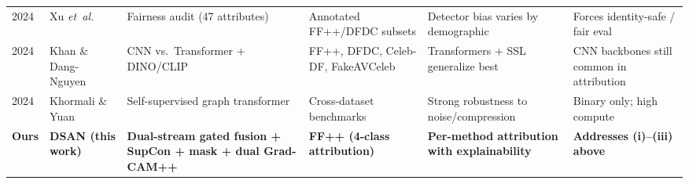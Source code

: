\begin{table}[!t]
\begin{tabular}{@{}p{0.6cm} p{2.6cm} p{3.7cm} p{2.6cm} p{2.9cm} p{3.4cm}@{}}
2024 & Xu \textit{et~al.}~\cite{xu2024fairness} & Fairness audit (47 attributes) & Annotated FF++/DFDC subsets & Detector bias varies by demographic & Forces identity-safe / fair eval \\
2024 & Khan \& Dang-Nguyen~\cite{khan2024generalization} & CNN vs.\ Transformer + DINO/CLIP & FF++, DFDC, Celeb-DF, FakeAVCeleb & Transformers + SSL generalize best & CNN backbones still common in attribution \\
2024 & Khormali \& Yuan~\cite{khormali2024selfsupgraph} & Self-supervised graph transformer & Cross-dataset benchmarks & Strong robustness to noise/compression & Binary only; high compute \\
\midrule
\textbf{Ours} & \textbf{DSAN (this work)} & \textbf{Dual-stream gated fusion + SupCon + mask + dual Grad-CAM++} & \textbf{FF++ (4-class attribution)} & \textbf{Per-method attribution with explainability} & \textbf{Addresses (i)--(iii) above} \\
\bottomrule
\end{tabular}
\end{table}
